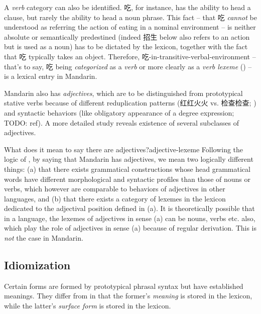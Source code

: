 \documentclass[UTF8, a4paper, oneside, scheme=plain, 12pt]{ctexrep}
\newcommand*{\term}[1]{\emph{#1}}
\newcommand{\form}[1]{\emph{#1}}
\begin{document}
A \term{verb} category can also be identified.
吃, for instance, has the ability to head a clause,
but rarely the ability to head a noun phrase.
This fact -- that 吃 \emph{cannot} be understood as referring the action of eating in a nominal environment -- is neither absolute or semantically predestined
(indeed 招生 below also refers to an action but is used as a noun)
has to be dictated by the lexicon,
together with the fact that 吃 typically takes an object.
Therefore, 吃-in-transitive-verbal-environment -- that's to say, 吃 being \term{categorized} as a \term{verb} or more clearly as a \term{verb lexeme} () -- 
is a lexical entry in Mandarin.

Mandarin also has \term{adjectives},
which are to be distinguished from prototypical stative verbs
because of different reduplication patterns
(红红火火 vs. 检查检查; )
and syntactic behaviors (like obligatory appearance of a degree expression; TODO: ref).
A more detailed study reveals existence of several subclasses of adjectives.

\begin{theorybox}{What does it mean to say there are adjectives?}{adjective-lexeme}
    Following the logic of ,
    by saying that Mandarin has adjectives, we mean two logically different things:
    (a) that there exists grammatical constructions whose head grammatical words
    have different morphological and syntactic profiles than those of nouns or verbs,
    which however are comparable to behaviors of adjectives in other languages, and 
    (b) that there exists a category of lexemes in the lexicon
    dedicated to the adjectival position defined in (a).
    It is theoretically possible that in a language,
    the lexemes of adjectives in sense (a) can be nouns, verbs etc. also,
    which play the role of adjectives in sense (a)
    because of regular derivation.
    This is \emph{not} the case in Mandarin.
\end{theorybox}

\subsection{Idiomization}\label{sec:grammatical.lexicon.idiom}

Certain forms are formed by prototypical phrasal syntax
but have established meanings.
They differ from  in that 
the former's \emph{meaning} is stored in the lexicon,
while the latter's \form{surface form} is stored in the lexicon.
\end{document}

